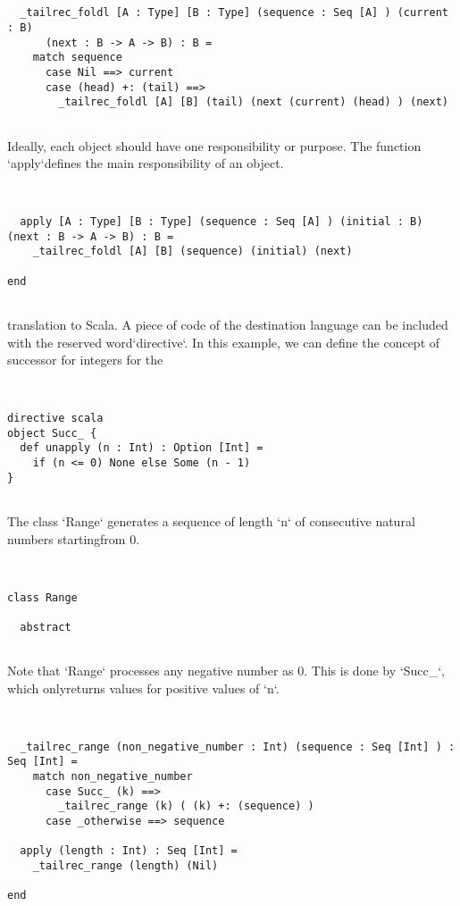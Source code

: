 \documentclass[12pt,a4paper]{article}
\begin{document}
\begin{lstlisting}


  _tailrec_foldl [A : Type] [B : Type] (sequence : Seq [A] ) (current : B)
      (next : B -> A -> B) : B =
    match sequence
      case Nil ==> current
      case (head) +: (tail) ==>
        _tailrec_foldl [A] [B] (tail) (next (current) (head) ) (next)


\end{lstlisting}

Ideally, each object should have one responsibility or purpose. The function `apply`defines the main responsibility of an object. 


\begin{lstlisting}


  apply [A : Type] [B : Type] (sequence : Seq [A] ) (initial : B) (next : B -> A -> B) : B =
    _tailrec_foldl [A] [B] (sequence) (initial) (next)

end


\end{lstlisting}

translation to Scala. A piece of code of the destination language can be included with the reserved word`directive`. In this example, we can define the concept of successor for integers for the


\begin{lstlisting}


directive scala
object Succ_ {
  def unapply (n : Int) : Option [Int] =
    if (n <= 0) None else Some (n - 1)
}


\end{lstlisting}

The class `Range` generates a sequence of length `n` of consecutive natural numbers startingfrom 0. 


\begin{lstlisting}


class Range

  abstract


\end{lstlisting}

Note that `Range` processes any negative number as 0. This is done by `Succ_`, which onlyreturns values for positive values of `n`. 


\begin{lstlisting}


  _tailrec_range (non_negative_number : Int) (sequence : Seq [Int] ) : Seq [Int] =
    match non_negative_number
      case Succ_ (k) ==>
        _tailrec_range (k) ( (k) +: (sequence) )
      case _otherwise ==> sequence

  apply (length : Int) : Seq [Int] =
    _tailrec_range (length) (Nil)

end


\end{lstlisting}
\end{document}
